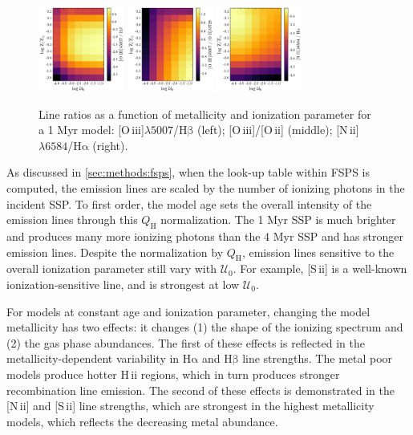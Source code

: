 \documentclass[linenumbers, trackchanges, tighten]{aastex61}%
\newcommand{\Sec}[1]{\autoref{sec:#1}}
\newcommand{\FSPS}{{\sc FSPS}\xspace}
\newcommand{\nii}{[N\,{\sc ii}]\xspace}
\newcommand{\sii}{[S\,{\sc ii}]\xspace}
\newcommand{\oiii}{[O\,{\sc iii}]\xspace}
\newcommand{\oii}{[O\,{\sc ii}]\xspace}
\newcommand{\ha}{\ensuremath{\mathrm{H\alpha}}}
\newcommand{\hb}{\ensuremath{\mathrm{H\beta}}}
\newcommand{\hii}{H\,{\sc ii}\xspace}
\newcommand\lam[1]{\ensuremath{\lambda #1}}
\newcommand{\QH}{\ensuremath{Q_{\mathrm{H}}}}
\newcommand{\U}{\ensuremath{\mathcal{U}_{0}}}
\newcommand\niiha{\nii{}\lam{6584}/\ha{}}
\newcommand\oiiihb{\oiii{}\lam{5007}/\hb{}}
\newcommand\oiiioii{\oiii{}/\oii{}}
\begin{document}
\begin{figure}[!htbp]
  \begin{centering}
    \includegraphics[width=0.25\textwidth]{f15a.pdf}
    \includegraphics[width=0.25\textwidth]{f15b.pdf}
    \includegraphics[width=0.25\textwidth]{f15c.pdf}
    \caption{Line ratios as a function of metallicity and ionization parameter for a 1 Myr model: \oiiihb{} (left); \oiiioii{} (middle); \niiha{} (right).}
    \label{fig:LineRatios}
  \end{centering}
\end{figure}

As discussed in \Sec{methods:fsps}, when the look-up table within \FSPS is computed, the emission lines are scaled by the number of ionizing photons in the incident SSP. To first order, the model age sets the overall intensity of the emission lines through this \QH{} normalization. The 1 Myr SSP is much brighter and produces many more ionizing photons than the 4 Myr SSP and has stronger emission lines. Despite the normalization by \QH{}, emission lines sensitive to the overall ionization parameter still vary with \U{}. For example, \sii{} is a well-known ionization-sensitive line, and is strongest at low \U{}.

For models at constant age and ionization parameter, changing the model metallicity has two effects: it changes (1) the shape of the ionizing spectrum and (2) the gas phase abundances. The first of these effects is reflected in the metallicity-dependent variability in \ha{} and \hb{} line strengths. The metal poor models produce hotter \hii regions, which in turn produces stronger recombination line emission. The second of these effects is demonstrated in the \nii{} and \sii{} line strengths, which are strongest in the highest metallicity models, which reflects the decreasing metal abundance.
\end{document}
